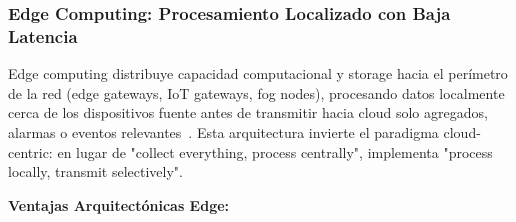 \subsubsection{Edge Computing: Procesamiento Localizado con Baja Latencia}

Edge computing distribuye capacidad computacional y storage hacia el perímetro de la red (edge gateways, IoT gateways, fog nodes), procesando datos localmente cerca de los dispositivos fuente antes de transmitir hacia cloud solo agregados, alarmas o eventos relevantes~\cite{andriuloEdgeComputingCloud2024,minhEdgeComputingIoTEnabled2022}. Esta arquitectura invierte el paradigma cloud-centric: en lugar de "collect everything, process centrally", implementa "process locally, transmit selectively".

\textbf{Ventajas Arquitectónicas Edge:}


